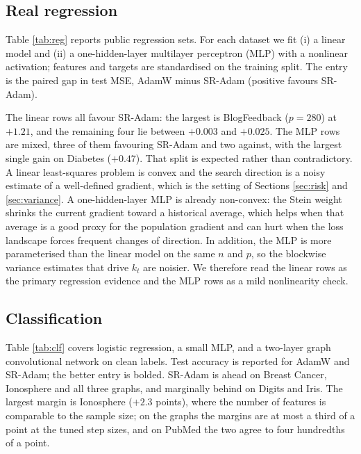 \documentclass[pdflatex,sn-mathphys-num]{sn-jnl}%
\theoremstyle{thmstyleone}%
\theoremstyle{thmstyletwo}%
\theoremstyle{thmstylethree}%
\begin{document}
\subsection{Real regression}

Table \ref{tab:reg} reports public regression sets. For each dataset we fit (i) a linear model and (ii) a one-hidden-layer multilayer perceptron (MLP) with a nonlinear activation; features and targets are standardised on the training split. The entry is the paired gap in test MSE, AdamW minus SR-Adam (positive favours SR-Adam).

The linear rows all favour SR-Adam: the largest is BlogFeedback ($p=280$) at $+1.21$, and the remaining four lie between $+0.003$ and $+0.025$. The MLP rows are mixed, three of them favouring SR-Adam and two against, with the largest single gain on Diabetes ($+0.47$). That split is expected rather than contradictory. A linear least-squares problem is convex and the search direction is a noisy estimate of a well-defined gradient, which is the setting of Sections \ref{sec:risk} and \ref{sec:variance}. A one-hidden-layer MLP is already non-convex: the Stein weight shrinks the current gradient toward a historical average, which helps when that average is a good proxy for the population gradient and can hurt when the loss landscape forces frequent changes of direction. In addition, the MLP is more parameterised than the linear model on the same $n$ and $p$, so the blockwise variance estimates that drive $k_t$ are noisier. We therefore read the linear rows as the primary regression evidence and the MLP rows as a mild nonlinearity check.

\begin{table}[t]
\centering
\caption{Regression on public tabular sets. Gap in test MSE, AdamW minus SR-Adam; bold positive entries favour SR-Adam. \emph{Model} is either a linear regressor or a one-hidden-layer MLP (nonlinear).}
\label{tab:reg}

\end{table}

\subsection{Classification}

Table \ref{tab:clf} covers logistic regression, a small MLP, and a two-layer graph convolutional network \cite{kipf2017} on clean labels. Test accuracy is reported for AdamW and SR-Adam; the better entry is bolded. SR-Adam is ahead on Breast Cancer, Ionosphere and all three graphs, and marginally behind on Digits and Iris. The largest margin is Ionosphere ($+2.3$ points), where the number of features is comparable to the sample size; on the graphs the margins are at most a third of a point at the tuned step sizes, and on PubMed the two agree to four hundredths of a point.
\end{document}
